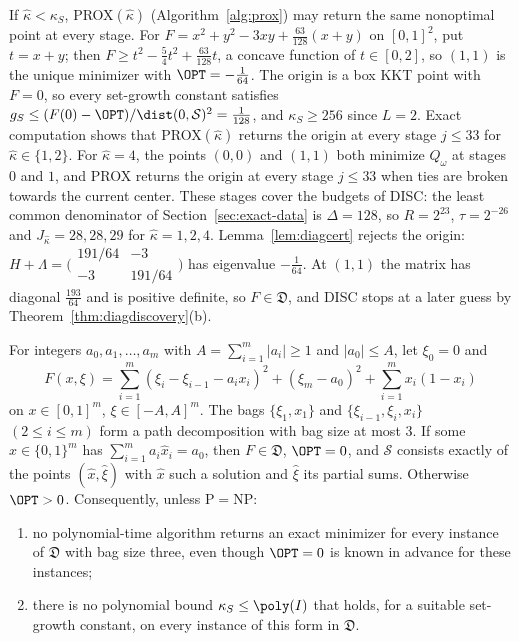 \begin{remark}\label{rem:falseguess}
If $\hat\kappa<\kappa_S$, PROX$(\hat\kappa)$ (Algorithm~\ref{alg:prox}) may
return the same nonoptimal point at every stage. For
$F=x^2+y^2-3xy+\frac{63}{128}(x+y)$ on $[0,1]^2$, put $t=x+y$; then $F\ge t^2-\frac54t^2+\frac{63}{128}t$, a concave function of
$t\in[0,2]$, so $(1,1)$ is the unique minimizer with $\OPT=-\frac1{64}$. The
origin is a box KKT point with $F=0$, so every set-growth constant
satisfies $g_S\le(F(0)-\OPT)/\dist(0,\mathcal S)^2=\frac1{128}$, and
$\kappa_S\ge256$ since $L=2$. Exact computation shows that
PROX$(\hat\kappa)$ returns the origin at every stage $j\le33$ for
$\hat\kappa\in\{1,2\}$. For
$\hat\kappa=4$, the points $(0,0)$ and $(1,1)$ both minimize $Q_\omega$ at
stages $0$ and $1$, and PROX returns the origin at every stage $j\le33$ when
ties are broken towards the current center. These stages cover the budgets
of DISC: the least common denominator of Section~\ref{sec:exact-data} is
$\Delta=128$, so $R=2^{23}$, $\tau=2^{-26}$ and $J_{\hat\kappa}=28,28,29$ for
$\hat\kappa=1,2,4$. Lemma~\ref{lem:diagcert} rejects the origin:
$H+\Lambda=\bigl(\begin{smallmatrix}191/64&-3\\-3&191/64\end{smallmatrix}\bigr)$
has eigenvalue $-\frac1{64}$. At $(1,1)$ the matrix has diagonal
$\frac{193}{64}$ and is positive definite, so $F\in\mathfrak D$, and DISC
stops at a later guess by Theorem~\ref{thm:diagdiscovery}(b).
\end{remark}

\begin{proposition}\label{prop:sshard}
For integers $a_0,a_1,\ldots,a_m$ with $A=\sum_{i=1}^m|a_i|\ge1$ and
$|a_0|\le A$, let $\xi_0=0$ and
\[
F(x,\xi)=\sum_{i=1}^m(\xi_i-\xi_{i-1}-a_ix_i)^2+(\xi_m-a_0)^2
+\sum_{i=1}^mx_i(1-x_i)
\]
on $x\in[0,1]^m$, $\xi\in[-A,A]^m$. The bags $\{\xi_1,x_1\}$ and
$\{\xi_{i-1},\xi_i,x_i\}$ $(2\le i\le m)$ form a path decomposition with bag
size at most $3$. If some $\hat x\in\{0,1\}^m$ has
$\sum_{i=1}^ma_i\hat x_i=a_0$, then $F\in\mathfrak D$, $\OPT=0$, and
$\mathcal S$ consists exactly of the points $(\hat x,\hat\xi)$ with $\hat x$
such a solution and $\hat\xi$ its partial sums. Otherwise $\OPT>0$.
Consequently, unless $\mathrm P=\mathrm{NP}$:
\begin{enumerate}[label=(\roman*)]
\item no polynomial-time algorithm returns an exact minimizer for every
instance of $\mathfrak D$ with bag size three, even though $\OPT=0$ is known
in advance for these instances;
\item there is no polynomial bound $\kappa_S\le\poly(I)$ that holds, for a
suitable set-growth constant, on every instance of this form in
$\mathfrak D$.
\end{enumerate}
\end{proposition}

